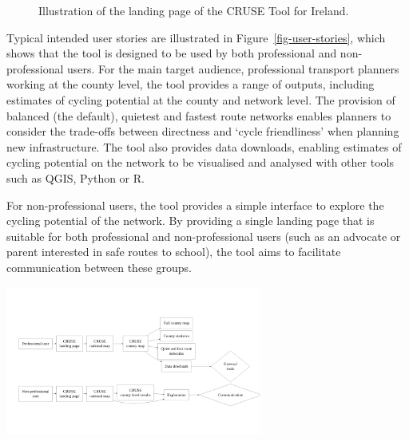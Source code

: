 \documentclass[
  super,
  preprint,
  3p]{elsarticle}
\begin{document}
\begin{figure}


\caption{\label{fig-landing}Illustration of the landing page of the
CRUSE Tool for Ireland.}

\end{figure}%

Typical intended user stories are illustrated in
Figure~\ref{fig-user-stories}, which shows that the tool is designed to
be used by both professional and non-professional users. For the main
target audience, professional transport planners working at the county
level, the tool provides a range of outputs, including estimates of
cycling potential at the county and network level. The provision of
balanced (the default), quietest and fastest route networks enables
planners to consider the trade-offs between directness and `cycle
friendliness' when planning new infrastructure. The tool also provides
data downloads, enabling estimates of cycling potential on the network
to be visualised and analysed with other tools such as QGIS, Python or
R.

For non-professional users, the tool provides a simple interface to
explore the cycling potential of the network. By providing a single
landing page that is suitable for both professional and non-professional
users (such as an advocate or parent interested in safe routes to
school), the tool aims to facilitate communication between these groups.

\includegraphics[width=3.31in,height=\textheight]{images/fig5.png}
\end{document}
